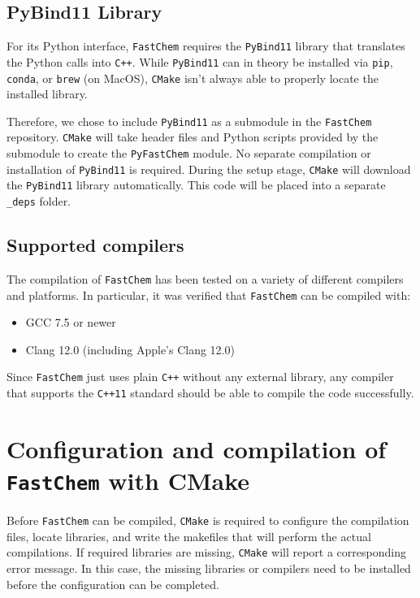 \documentclass[numbers=noenddot]{fcmanual}
\newcommand{\fc}{\texttt{FastChem}\xspace}
\newcommand{\cpp}{\ttt{C++}\xspace}
\newcommand{\pb}{\texttt{PyBind11}\xspace}
\newcommand{\ttt}[1]{\texttt {#1}}
\begin{document}
\subsection{PyBind11 Library}

For its Python interface, \fc requires the \pb library that translates the Python calls into \cpp. While \pb can in theory be installed via \texttt{pip}, \texttt{conda}, or \texttt{brew} (on MacOS), \texttt{CMake} isn't always able to properly locate the installed library. 

Therefore, we chose to include \pb as a submodule in the \fc repository. \texttt{CMake} will take header files and Python scripts provided by the submodule to create the \texttt{PyFastChem} module. No separate compilation or installation of \pb is required. During the setup stage, \texttt{CMake} will download the \pb library automatically. This code will be placed into a separate \texttt{\_deps} folder.


\subsection{Supported compilers}

The compilation of \fc has been tested on a variety of different compilers and platforms. In particular, it was verified that \fc can be compiled with:
\begin{itemize}
  \item GCC 7.5 or newer
  \item Clang 12.0 (including Apple's Clang 12.0)
\end{itemize}

Since \fc just uses plain \cpp without any external library, any compiler that supports the \ttt{C++11} standard should be able to compile the code successfully.


\section{Configuration and compilation of \fc with CMake}
\label{sec:install_config}

Before \fc can be compiled, \texttt{CMake} is required to configure the compilation files, locate libraries, and write the makefiles that will perform the actual compilations. If required libraries are missing, \texttt{CMake} will report a corresponding error message. In this case, the missing libraries or compilers need to be installed before the configuration can be completed.\\
\end{document}
